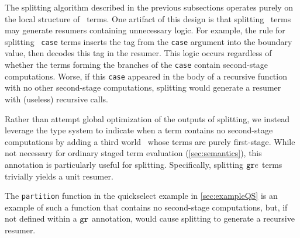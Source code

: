 \begin{abstrsyn}
The splitting algorithm described in the previous subsections operates
purely on the local structure of \lang\ terms.  One artifact of this design
is that splitting \bbonem\ terms may generate resumers containing
unnecessary logic.  For example, the rule for splitting
\bbonem\ \texttt{case} terms inserts the tag from the \texttt{case}
argument into the boundary value, then decodes this tag in the
resumer. This logic occurs regardless of whether the terms forming the
branches of the \texttt{case} contain second-stage computations.
Worse, if this \texttt{case} appeared in the body of a recursive
function with no other second-stage computations, splitting would
generate a resumer with (useless) recursive calls.

Rather than attempt global optimization of the outputs of splitting,
we instead leverage the type system to indicate when a term contains
no second-stage computations by adding a third world \bbonep\ whose
terms are purely first-stage.  While not necessary for ordinary staged
term evaluation (\ref{sec:semantics}), this annotation is
particularly useful for splitting. Specifically, splitting ${\tt gr} e$
terms trivially yields a unit resumer.

The \texttt{partition} function in the quickselect example in
\ref{sec:exampleQS} is an example of such a function that contains no
second-stage computations, but, if not defined within a ${\tt gr}$
annotation, would cause splitting to generate a recursive resumer.

\end{abstrsyn}



